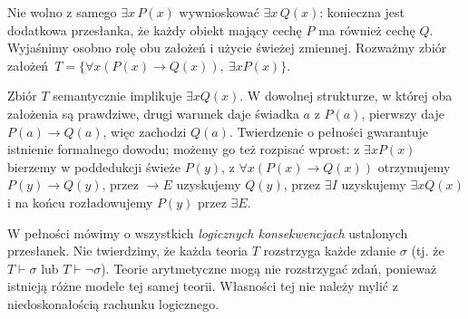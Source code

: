 \begin{przyklad}
Nie wolno z samego $\exists x\,P(x)$ wywnioskować
$\exists x\,Q(x)$: konieczna jest dodatkowa przesłanka,
że każdy obiekt mający cechę $P$ ma również cechę $Q$.
Wyjaśnimy osobno rolę obu założeń i użycie świeżej zmiennej.
Rozważmy zbiór założeń\, $T=\{\forall x(P(x)\to Q(x)),\ \exists x P(x)\}$.\par\noindent\ignorespaces
Zbiór $T$ semantycznie implikuje $\exists x Q(x)$. W dowolnej strukturze, w której oba założenia są prawdziwe, drugi warunek daje świadka $a$ z $P(a)$, pierwszy daje $P(a)\to Q(a)$, więc zachodzi $Q(a)$. Twierdzenie o pełności gwarantuje istnienie formalnego dowodu; możemy go też rozpisać wprost: z $\exists x P(x)$ bierzemy w poddedukcji świeże $P(y)$, z $\forall x(P(x)\to Q(x))$ otrzymujemy $P(y)\to Q(y)$, przez $\to E$ uzyskujemy $Q(y)$, przez $\exists I$ uzyskujemy $\exists x Q(x)$ i na końcu rozładowujemy $P(y)$ przez $\exists E$.
\end{przyklad}

\begin{uwaga}
W pełności mówimy o wszystkich \emph{logicznych konsekwencjach} ustalonych przesłanek. Nie twierdzimy, że każda teoria $T$ rozstrzyga każde zdanie $\sigma$ (tj. że $T\vdash\sigma$ lub $T\vdash\neg\sigma$). Teorie arytmetyczne mogą nie rozstrzygać zdań, ponieważ istnieją różne modele tej samej teorii. Własności tej nie należy mylić z niedoskonałością rachunku logicznego.
\end{uwaga}